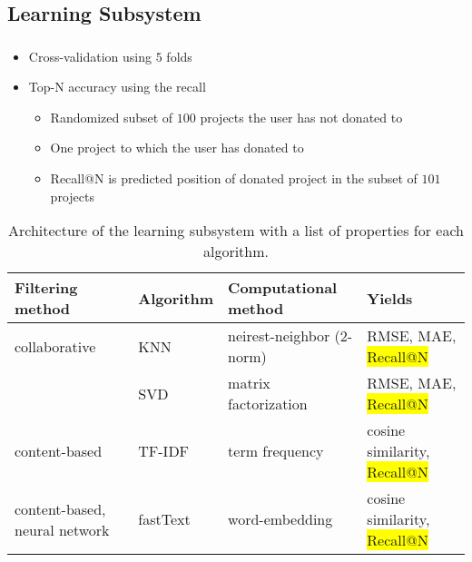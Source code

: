 \documentclass[aspectratio=169]{beamer}
\begin{document}
\subsection{Learning Subsystem}
\begin{frame}
	\frametitle{\insertsection}
	\framesubtitle{\insertsubsection}

	\begin{itemize}
		\item Cross-validation using $5$ folds
		\item Top-N accuracy using the recall
		\begin{itemize}
			\item Randomized subset of $100$ projects the user has not donated to
			\item One project to which the user has donated to
			\item Recall@N is predicted position of donated project in the subset of $101$ projects
		\end{itemize}
	\end{itemize}

	\begin{table}
		\scriptsize
		\centering
		\begin{tabular}{l|lll}
			Filtering method & Algorithm & Computational method & Yields \\
			\hline
			\hline
			collaborative & KNN & neirest-neighbor (2-norm) & RMSE, MAE, \colorbox{yellow}{Recall@N} \\
			& SVD & matrix factorization & RMSE, MAE, \colorbox{yellow}{Recall@N} \\
			\hline
			content-based & TF-IDF & term frequency & cosine similarity, \colorbox{yellow}{Recall@N} \\
			\hline
			content-based, neural network & fastText & word-embedding & cosine similarity, \colorbox{yellow}{Recall@N} \\
		\end{tabular}
		\caption{Architecture of the learning subsystem with a list of properties for each algorithm.}
	\end{table}
\end{frame}
\end{document}
